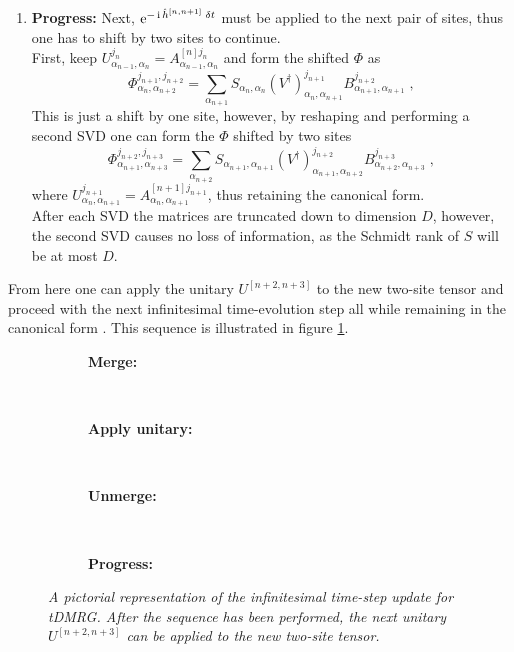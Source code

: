 \begin{enumerate}
\item
\textbf{Progress:}  Next, $\operatorname{e}^{- \operatorname{i} \hat{h}^{[n , n+1]} \; \delta t }$ must be applied to the next pair of sites, thus one has to shift by two sites to continue.\\
First, keep $U_{\alpha_{n-1} , \alpha_{n}}^{j_n } = A_{\alpha_{n-1} , \alpha_{n}}^{[n] j_n }$ and form the shifted $\Phi$ as
\begin{equation}
	\Phi_{\alpha_{n} , \alpha_{n+2}}^{j_{n+1} , j_{n+2}} = \sum_{\alpha_{n+1}}  S_{\alpha_n , \alpha_n} (V^{\dag})_{\alpha_{n} , \alpha_{n+1}}^{j_{n+1} } B_{\alpha_{n+1} , \alpha_{n+1}}^{j_{n+2}} \; ,
\end{equation}
This is just a shift by one site, however, by reshaping and performing a second SVD one can form the $\Phi$ shifted by two sites
\begin{equation}
	\Phi_{\alpha_{n+1} , \alpha_{n+3}}^{j_{n+2} , j_{n+3}} = \sum_{\alpha_{n+2}}  S_{\alpha_{n+1} , \alpha_{n+1}} (V^{\dag})_{\alpha_{n+1} , \alpha_{n+2}}^{j_{n+2} } B_{\alpha_{n+2} , \alpha_{n+3}}^{j_{n+3}} \; ,
\end{equation}
where $U_{\alpha_{n} , \alpha_{n+1}}^{j_{n+1} } = A_{\alpha_{n} , \alpha_{n+1}}^{[n+1] j_{n+1} }$, thus retaining the canonical form.\\
After each SVD the matrices are truncated down to dimension $D$, however, the second SVD causes no loss of information, as the Schmidt rank of $S$ will be at most $D$. 
\end{enumerate}
From here one can apply the unitary $U^{[n+2 , n+3]}$ to the new two-site tensor and proceed with the next infinitesimal time-evolution step all while remaining in the canonical form \cite{Schollwock}. This sequence is illustrated in figure \ref{fig:tDMRG}.

\renewcommand{\thesubfigure}{\arabic{subfigure}}
\begin{figure}[h!]
	\centering
	\begin{subfigure}{\textwidth}
		\centering
		\caption{\textbf{Merge:}}
		
	\end{subfigure}\\[.5cm]
	
	\begin{subfigure}{\textwidth}
		\centering
		\caption{\textbf{Apply unitary:}}
		
	\end{subfigure}\\[.5cm]
	
	\begin{subfigure}{\textwidth}
		\centering
		\caption{\textbf{Unmerge:}}
		
	\end{subfigure}\\[.5cm]

	\begin{subfigure}{\textwidth}
		\centering
		\caption{\textbf{Progress:}}
		
	\end{subfigure}
	\caption{\textit{A pictorial representation of the infinitesimal time-step update for tDMRG. After the sequence has been performed, the next unitary $U^{[n+2 , n+3]}$ can be applied to the new two-site tensor.}}
	\label{fig:tDMRG}
\end{figure}